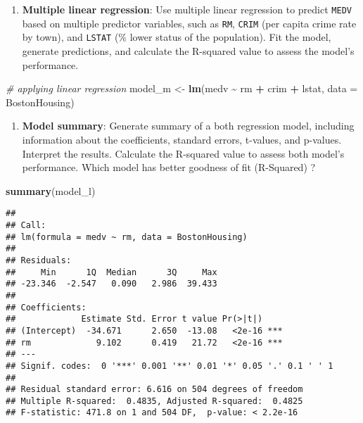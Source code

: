 \documentclass[
]{book}
\newenvironment{Shaded}{\begin{snugshade}}{\end{snugshade}}
\newcommand{\AttributeTok}[1]{\textcolor[rgb]{0.13,0.29,0.53}{#1}}
\newcommand{\CommentTok}[1]{\textcolor[rgb]{0.56,0.35,0.01}{\textit{#1}}}
\newcommand{\FunctionTok}[1]{\textcolor[rgb]{0.13,0.29,0.53}{\textbf{#1}}}
\newcommand{\NormalTok}[1]{#1}
\newcommand{\OtherTok}[1]{\textcolor[rgb]{0.56,0.35,0.01}{#1}}
\newcommand{\SpecialCharTok}[1]{\textcolor[rgb]{0.81,0.36,0.00}{\textbf{#1}}}
\providecommand{\tightlist}{%
  \setlength{\itemsep}{0pt}\setlength{\parskip}{0pt}}
\begin{document}
\begin{enumerate}
\def\labelenumi{\arabic{enumi}.}
\setcounter{enumi}{1}
\tightlist
\item
  \textbf{Multiple linear regression}: Use multiple linear regression to predict \texttt{MEDV} based on multiple predictor variables, such as \texttt{RM}, \texttt{CRIM} (per capita crime rate by town), and \texttt{LSTAT} (\% lower status of the population). Fit the model, generate predictions, and calculate the R-squared value to assess the model's performance.
\end{enumerate}

\begin{Shaded}
\begin{Highlighting}[]
\CommentTok{\# applying linear regression}
\NormalTok{model\_m }\OtherTok{\textless{}{-}} \FunctionTok{lm}\NormalTok{(medv }\SpecialCharTok{\textasciitilde{}}\NormalTok{ rm }\SpecialCharTok{+}\NormalTok{ crim }\SpecialCharTok{+}\NormalTok{ lstat, }\AttributeTok{data =}\NormalTok{ BostonHousing)}
\end{Highlighting}
\end{Shaded}

\begin{enumerate}
\def\labelenumi{\arabic{enumi}.}
\setcounter{enumi}{2}
\tightlist
\item
  \textbf{Model summary}: Generate summary of a both regression model, including information about the coefficients, standard errors, t-values, and p-values. Interpret the results. Calculate the R-squared value to assess both model's performance. Which model has better goodness of fit (R-Squared) ?
\end{enumerate}

\begin{Shaded}
\begin{Highlighting}[]
\FunctionTok{summary}\NormalTok{(model\_l)}
\end{Highlighting}
\end{Shaded}

\begin{verbatim}
## 
## Call:
## lm(formula = medv ~ rm, data = BostonHousing)
## 
## Residuals:
##     Min      1Q  Median      3Q     Max 
## -23.346  -2.547   0.090   2.986  39.433 
## 
## Coefficients:
##             Estimate Std. Error t value Pr(>|t|)    
## (Intercept)  -34.671      2.650  -13.08   <2e-16 ***
## rm             9.102      0.419   21.72   <2e-16 ***
## ---
## Signif. codes:  0 '***' 0.001 '**' 0.01 '*' 0.05 '.' 0.1 ' ' 1
## 
## Residual standard error: 6.616 on 504 degrees of freedom
## Multiple R-squared:  0.4835, Adjusted R-squared:  0.4825 
## F-statistic: 471.8 on 1 and 504 DF,  p-value: < 2.2e-16
\end{verbatim}
\end{document}
